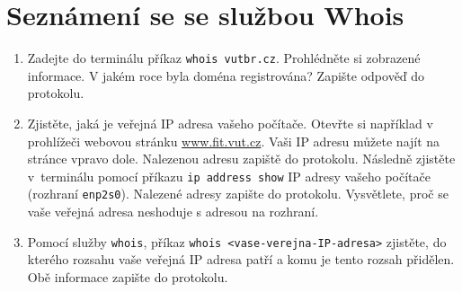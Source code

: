 \section{Seznámení se se službou Whois}
\begin{enumerate}
    \item Zadejte do terminálu příkaz \texttt{whois vutbr.cz}. Prohlédněte si zobrazené informace. V jakém roce byla doména registrována? Zapište odpověď do protokolu.
    \item Zjistěte, jaká je veřejná IP adresa vašeho počítače. Otevřte si například v prohlížeči webovou stránku \url{www.fit.vut.cz}. Vaši IP adresu můžete najít na stránce vpravo dole. Nalezenou adresu zapiště do protokolu. Následně zjistěte v~terminálu pomocí příkazu \texttt{ip address show} IP adresy vašeho počítače (rozhraní \texttt{enp2s0}). Nalezené adresy zapište do protokolu. Vysvětlete, proč se vaše veřejná adresa neshoduje s adresou na rozhraní. 
    \item Pomocí služby {\tt  whois}, příkaz \texttt{whois <vase-verejna-IP-adresa>} zjistěte, do kterého rozsahu vaše veřejná IP adresa patří a komu je tento rozsah přidělen. Obě informace zapište do protokolu.
\end{enumerate}


